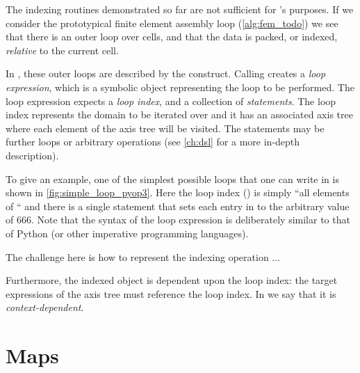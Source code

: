 \documentclass[thesis]{subfiles}
\begin{document}
The indexing routines demonstrated so far are not sufficient for 's purposes.
If we consider the prototypical finite element assembly loop (\cref{alg:fem_todo}) we see that there is an outer loop over cells, and that the data is packed, or indexed, \textit{relative} to the current cell.

In , these outer loops are described by the  construct.
Calling  creates a \textit{loop expression}, which is a symbolic object representing the loop to be performed.
The loop expression expects a \textit{loop index}, and a collection of \textit{statements}.
The loop index represents the domain to be iterated over and it has an associated axis tree where each element of the axis tree will be visited.
The statements may be further loops or arbitrary operations (see \cref{ch:dsl} for a more in-depth description).

To give an example, one of the simplest possible loops that one can write in  is shown in \cref{fig:simple_loop_pyop3}.
Here the loop index () is simply ``all elements of `` and there is a single statement that sets each entry in  to the arbitrary value of 666.
Note that the syntax of the loop expression is deliberately similar to that of Python (or other imperative programming languages).

The challenge here is how to represent the indexing operation ...


Furthermore, the indexed object is dependent upon the loop index: the target expressions of the axis tree must reference the loop index.
In  we say that it is \textit{context-dependent}.



\section{Maps}
\end{document}
